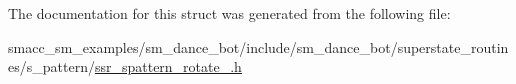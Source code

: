 The documentation for this struct was generated from the following file\+:\begin{DoxyCompactItemize}
\item 
smacc\+\_\+sm\+\_\+examples/sm\+\_\+dance\+\_\+bot/include/sm\+\_\+dance\+\_\+bot/superstate\+\_\+routines/s\+\_\+pattern/\hyperlink{ssr__spattern__rotate__4_8h}{ssr\+\_\+spattern\+\_\+rotate\+\_.\+h}\end{DoxyCompactItemize}
